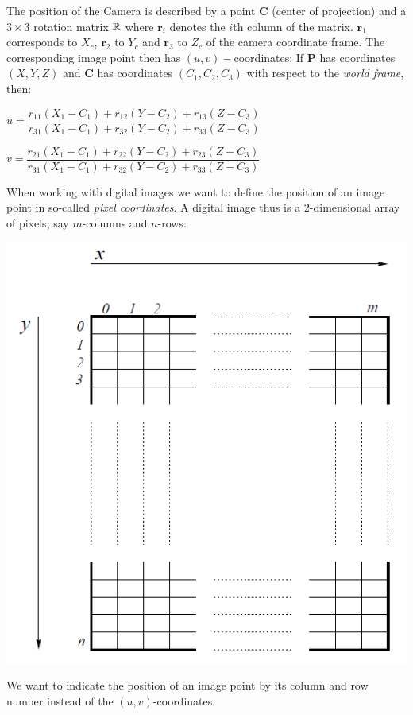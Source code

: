 \documentclass[a4paper, fontsize=8pt, landscape, DIV=1]{scrartcl}
\begin{document}
\begin{multicols*}{4}
\begin{center}
		\end{center}
		The position of the Camera is described by a point \textbf{C} (center of projection) and a $3\times3$ rotation matrix $\mathbb{R}$ where $\mathbf{r}_i$ denotes the $i$th column of the matrix. $\mathbf{r}_1$ corresponds to $X_c$, $\mathbf{r}_2$ to $Y_c$ and $\mathbf{r}_3$ to $Z_c$ of the camera coordinate frame. The corresponding image point then has $(u,v)-$coordinates:
		If \textbf{P} has coordinates $(X,Y,Z)$ and \textbf{C} has coordinates $(C_1,C_2,C_3)$ with respect to the \textit{world frame}, then:
		\par   
		$u=\dfrac{r_{11}(X_1-C_1)+r_{12}(Y-C_2)+r_{13}(Z-C_3)}{r_{31}(X_1-C_1)+r_{32}(Y-C_2)+r_{33}(Z-C_3)}$
		\par
		$v=\dfrac{r_{21}(X_1-C_1)+r_{22}(Y-C_2)+r_{23}(Z-C_3)}{r_{31}(X_1-C_1)+r_{32}(Y-C_2)+r_{33}(Z-C_3)}$
		\par 
		When working with digital images we want to define the position of an image point in so-called \textit{pixel coordinates}. A digital image thus is a 2-dimensional array of pixels, say $m$-columns and $n$-rows:\\
		\begin{center}
			\includegraphics[width=0.7\columnwidth]{images/ImageAcq/pixel_coordinates.png}\\
		\end{center}
		We want to indicate the position of an image point by its column and row number instead of the $(u,v)$-coordinates.

\end{multicols*}
\end{document}
